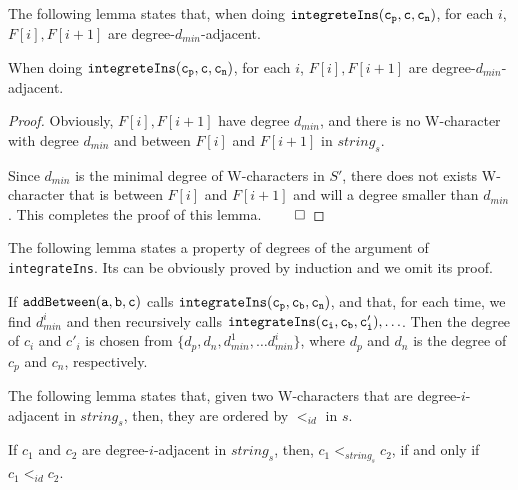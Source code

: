 The following lemma states that, when doing $\alabelshort[{\tt integreteIns}]{c_p,c,c_n}$, for each $i$, $F[i],F[i+1]$ are degree-$d_{min}$-adjacent.

\begin{lemma}
\label{lemma:in F of Wooki, W-characters are degree-dmin-adjacent}
When doing $\alabelshort[{\tt integreteIns}]{c_p,c,c_n}$, for each $i$, $F[i],F[i+1]$ are degree-$d_{min}$-adjacent.
\end{lemma}

\begin {proof}
Obviously, $F[i],F[i+1]$ have degree $d_{min}$, and there is no W-character with degree $d_{min}$ and between $F[i]$ and $F[i+1]$ in $string_s$.

Since $d_{min}$ is the minimal degree of W-characters in $S'$, there does not exists W-character that is between $F[i]$ and $F[i+1]$ and will a degree smaller than $d_{min}$. This completes the proof of this lemma. $\qed$
\end {proof}


The following lemma states a property of degrees of the argument of {\tt integrateIns}. Its can be obviously proved by induction and we omit its proof.

\begin{lemma}
\label{lemma:a property of degree of argument of integrateIns}
If $\alabelshort[{\tt addBetween}]{a,b,c}$ calls $\alabelshort[{\tt integrateIns}]{c_p,c_b,c_n}$, and that, for each time, we find $d_{min}^i$ and then recursively calls $\alabelshort[{\tt integrateIns}]{c_i,c_b,c'_i},\ldots$. Then the degree of $c_i$ and $c'_i$ is chosen from $\{ d_p,d_n,d_{min}^1,\ldots d_{min}^i \}$, where $d_p$ and $d_n$ is the degree of $c_p$ and $c_n$, respectively.
\end{lemma}


The following lemma states that, given two W-characters that are degree-$i$-adjacent in $string_s$, then, they are ordered by $<_{id}$ in $s$.

\begin{lemma}
\label{lemma:in strings, given two degree-i-adjacent W-characters, they are ordered by id order}
If $c_1$ and $c_2$ are degree-$i$-adjacent in $string_s$, then, $c_1 <_{string_s} c_2$, if and only if $c_1 <_{id} c_2$.
\end{lemma}


